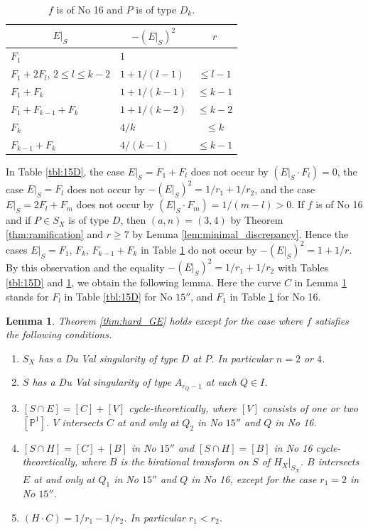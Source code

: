 \documentclass[a4paper,11pt]{amsart}
\newtheorem{lemma}[theorem]{Lemma}
\theoremstyle{definition}
\theoremstyle{remark}
\numberwithin{equation}{section}
\newcommand{\bP}{{\mathbb P}}
\begin{document}
\begin{table}[ht]
\caption{$f$ is of No 16 and $P$ is of type $D_k$.}\label{tbl:16D}
\begin{tabular}{l|l|c}
\hline
\multicolumn{1}{c|}{$E|_S$} & \multicolumn{1}{c|}{$-(E|_S)^2$} & $r$ \\
\hline
$F_1$                       & $1$         &           \\
$F_1+2F_l$, $2\le l\le k-2$ & $1+1/(l-1)$ & $\le l-1$ \\
$F_1+F_k$                   & $1+1/(k-1)$ & $\le k-1$ \\
$F_1+F_{k-1}+F_k$           & $1+1/(k-2)$ & $\le k-2$ \\
$F_k$                       & $4/k$       & $\le k$   \\
$F_{k-1}+F_k$               & $4/(k-1)$   & $\le k-1$ \\
\hline
\end{tabular}
\end{table}

In Table \ref{tbl:15D},
the case $E|_S=F_1+F_l$ does not occur by $(E|_S \cdot F_l)=0$,
the case $E|_S=F_l$ does not occur by $-(E|_S)^2=1/r_1+1/r_2$,
and the case $E|_S=2F_l+F_m$ does not occur by $(E|_S \cdot F_m)=1/(m-l)>0$.
If $f$ is of No 16 and if $P \in S_X$ is of type $D$,
then $(a,n)=(3,4)$ by Theorem \ref{thm:ramification}
and $r\ge7$ by Lemma \ref{lem:minimal_discrepancy}.
Hence the cases $E|_S=F_1$, $F_k$, $F_{k-1}+F_k$ in Table \ref{tbl:16D}
do not occur by $-(E|_S)^2=1+1/r$.
By this observation and the equality $-(E|_S)^2=1/r_1+1/r_2$
with Tables \ref{tbl:15D} and \ref{tbl:16D},
we obtain the following lemma.
Here the curve $C$ in Lemma \ref{lem:15/16small_D} stands for
$F_l$ in Table \ref{tbl:15D} for No $\textrm{15}''$,
and $F_1$ in Table \ref{tbl:16D} for No 16.

\begin{lemma}\label{lem:15/16small_D}
Theorem \textup{\ref{thm:hard_GE}} holds
except for the case where $f$ satisfies the following conditions.
\begin{enumerate}
\item
$S_X$ has a Du Val singularity of type $D$ at $P$.
In particular $n=2$ or $4$.
\item
$S$ has a Du Val singularity of type $A_{r_Q-1}$ at each $Q \in I$.
\item
$[S \cap E]=[C]+[V]$ cycle-theoretically,
where $[V]$ consists of one or two $[\bP^1]$.
$V$ intersects $C$ at and only at
$Q_2$ in No $\textrm{15}''$ and $Q$ in No 16.
\item
$[S \cap H]=[C]+[B]$ in No $\textrm{15}''$
and $[S \cap H]=[B]$ in No 16 cycle-theoretically,
where $B$ is the birational transform on $S$ of $H_X|_{S_X}$.
$B$ intersects $E$ at and only at
$Q_1$ in No $\textrm{15}''$ and $Q$ in No 16,
except for the case $r_1=2$ in No $\textrm{15}''$.
\item
$(H \cdot C)=1/r_1-1/r_2$.
In particular $r_1<r_2$.
\end{enumerate}
\end{lemma}
\end{document}
